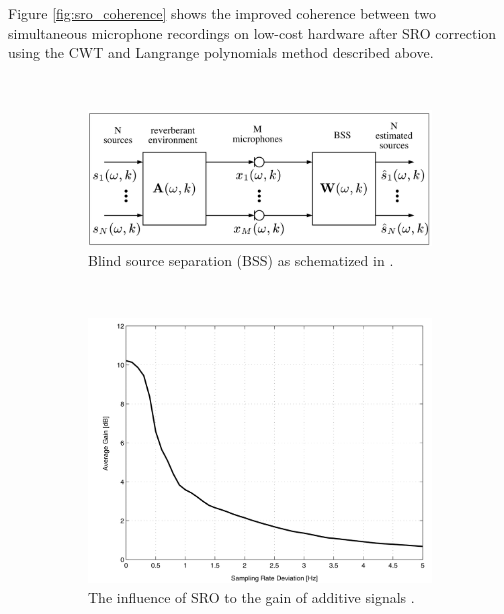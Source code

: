 Figure \ref{fig:sro_coherence} shows the improved coherence between two simultaneous microphone recordings on low-cost hardware after SRO correction using the CWT and Langrange polynomials method described above.

\begin{figure}[b!]
\centering
\caption{}
~
        \begin{subfigure}[b]{0.27\textwidth}
                \includegraphics[width=\textwidth]{images/bss}
                \caption{Blind source separation (BSS) as schematized in \cite{wehr2004}.}
                \label{fig:bss}
        \end{subfigure}
        ~ %
        \begin{subfigure}[b]{0.27\textwidth}
                \includegraphics[width=\textwidth]{images/bss_sensitivity}
                \caption{The influence of SRO to the gain of additive signals \cite{wehr2004}.}
                \label{fig:bss_sensitivity}
        \end{subfigure}
        ~ %
        \begin{subfigure}[b]{0.27\textwidth}

\end{subfigure}
\end{figure}
